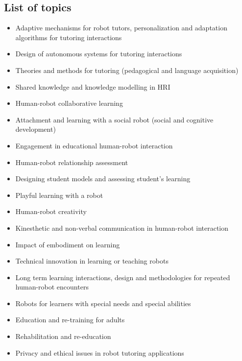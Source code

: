 \documentclass{sig-alternate-05-2015}
\begin{document}
\subsection*{List of topics}
\begin{itemize}[nosep]
	\item Adaptive mechanisms for robot tutors, personalization and adaptation algorithms for tutoring interactions
	\item Design of autonomous systems for tutoring interactions
	\item Theories and methods for tutoring (pedagogical and  language acquisition)
	\item Shared knowledge and knowledge modelling in HRI 
	\item Human-robot collaborative learning
	\item Attachment and learning with a social robot (social and cognitive development)
	\item Engagement in educational human-robot interaction
	\item Human-robot relationship assessment
	\item Designing student models and assessing student’s learning    
	\item Playful learning with a robot
	\item Human-robot creativity     
	\item Kinesthetic and non-verbal communication in human-robot interaction    
	\item Impact of embodiment on learning   
	\item Technical innovation in learning or teaching robots
	\item Long term learning interactions, design and methodologies for repeated human-robot encounters
	\item Robots for learners with special needs and special abilities
	\item Education and re-training for adults      
	\item Rehabilitation and re-education
	\item Privacy and ethical issues in robot tutoring applications
\end{itemize}





%
%  
\end{document}
